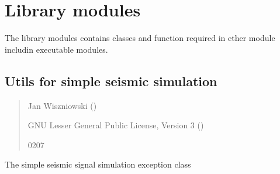 \documentclass[letterpaper,10pt,english]{sphinxmanual}
\begin{document}
\sphinxstepscope


\section{Library modules}
\label{\detokenize{api_lib:library-modules}}\label{\detokenize{api_lib::doc}}
\sphinxAtStartPar
The library modules contains classes and function
required in ether module includin executable modules.

\subsection{Utils for simple seismic simulation}
\label{\detokenize{api_lib:utils-for-simple-seismic-simulation}}\label{\detokenize{api_lib:module-utils}}\begin{quote}\begin{description}
\sphinxAtStartPar
Jan Wiszniowski ()

\sphinxAtStartPar
GNU Lesser General Public License, Version 3
()

\sphinxhyphen{}02\sphinxhyphen{}07

\end{description}\end{quote}

\begin{fulllineitems}
\label{\detokenize{api_lib:utils.SSSException}}
\pysigstartsignatures
{}
\pysigstopsignatures
\sphinxAtStartPar
The simple seismic signal simulation exception class

\end{fulllineitems}

\end{document}
